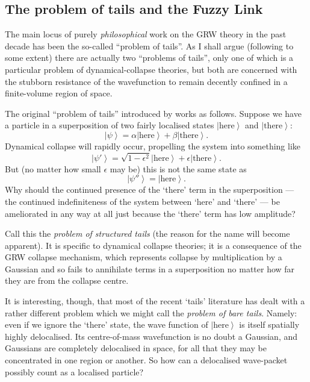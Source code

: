 \documentclass[12pt]{article}
\newcommand{\be}{\begin{equation}}
\newcommand{\ee}{\end{equation}}
\newcommand{\ket}[1]{\ensuremath{\left|  #1 \right\rangle}}
\begin{document}
\subsection{The problem of tails and the Fuzzy Link}\label{DMWWtails}

The main locus of purely \emph{philosophical} work on the GRW theory in the past decade has been the so-called ``problem of tails''. 
As I shall argue (following  to some extent) there are actually two ``problems of tails'', only one of which is a particular problem of dynamical-collapse theories, but both are concerned with the stubborn resistance of the wavefunction to remain decently confined in a finite-volume region of space.

The original ``problem of tails'' introduced by   works as follows. Suppose we have a particle in a superposition of two fairly localised states \ket{\mathrm{\mbox{here}}} and \ket{\mathrm{\mbox{there}}}:
\be \ket{\psi}=\alpha\ket{\mathrm{\mbox{here}}}+\beta\ket{\mathrm{\mbox{there}}}.\ee
Dynamical collapse will rapidly occur, propelling the system into something like
\be \ket{\psi'}=\sqrt{1-\epsilon^2}\ket{\mathrm{\mbox{here}}}+\epsilon\ket{\mathrm{\mbox{there}}}.\ee
But (no matter how small $\epsilon$ may be) this is not the same state as
\be\ket{\psi''}=\ket{\mathrm{\mbox{here}}}.\ee
Why should the continued presence of the `there' term in the superposition --- the continued indefiniteness of the system between `here' and `there' --- be ameliorated in any way at all just because the `there' term has low amplitude?

Call this the \emph{problem of structured tails} (the reason for the name will become apparent).  It is specific to dynamical collapse theories; it is a consequence of the GRW collapse mechanism, which represents collapse by multiplication by a Gaussian and so fails to annihilate terms in a superposition no matter how far they are from the collapse centre.

It is interesting, though, that most of the recent `tails' literature has dealt with a rather different problem which we might call the \emph{problem of bare tails}. Namely: even if we ignore the `there' state, the wave function of \ket{\mathrm{\mbox{here}}} is itself spatially highly delocalised. Its centre-of-mass wavefunction is no doubt a Gaussian, and Gaussians are completely delocalised in space, for all that they may be concentrated in one region or another. So how can a delocalised wave-packet possibly count as a localised particle?
\end{document}
